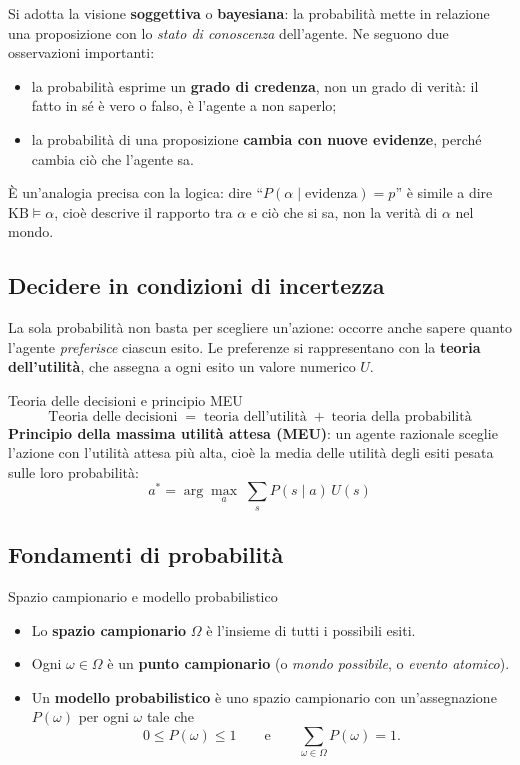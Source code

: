 \documentclass[11pt, a4paper]{article}
\renewcommand{\emph}[1]{\textcolor{verdechiaro}{\itshape #1}}
\newcommand{\KB}{\mathrm{KB}}
\begin{document}
Si adotta la visione \textbf{soggettiva} o \textbf{bayesiana}: la probabilità mette in relazione una proposizione con lo \emph{stato di conoscenza} dell'agente. Ne seguono due osservazioni importanti:
\begin{itemize}
  \item la probabilità esprime un \textbf{grado di credenza}, non un grado di verità: il fatto in sé è vero o falso, è l'agente a non saperlo;
  \item la probabilità di una proposizione \textbf{cambia con nuove evidenze}, perché cambia ciò che l'agente sa.
\end{itemize}

È un'analogia precisa con la logica: dire ``$P(\alpha \mid \text{evidenza}) = p$'' è simile a dire $\KB \models \alpha$, cioè descrive il rapporto tra $\alpha$ e ciò che si sa, non la verità di $\alpha$ nel mondo.

\subsection{Decidere in condizioni di incertezza}

La sola probabilità non basta per scegliere un'azione: occorre anche sapere quanto l'agente \emph{preferisce} ciascun esito. Le preferenze si rappresentano con la \textbf{teoria dell'utilità}, che assegna a ogni esito un valore numerico $U$.

\begin{chiave}{Teoria delle decisioni e principio MEU}
  \[
    \text{Teoria delle decisioni} \;=\; \text{teoria dell'utilità} \;+\; \text{teoria della probabilità}
  \]
  \textbf{Principio della massima utilità attesa (MEU)}: un agente razionale sceglie l'azione con l'utilità attesa più alta, cioè la media delle utilità degli esiti pesata sulle loro probabilità:
  \[
    a^* = \arg\max_{a} \; \sum_{s} P(s \mid a)\, U(s)
  \]
\end{chiave}

\subsection{Fondamenti di probabilità}

\begin{defbox}{Spazio campionario e modello probabilistico}
  \begin{itemize}
    \item Lo \textbf{spazio campionario} $\Omega$ è l'insieme di tutti i possibili esiti.
    \item Ogni $\omega \in \Omega$ è un \textbf{punto campionario} (o \emph{mondo possibile}, o \emph{evento atomico}).
    \item Un \textbf{modello probabilistico} è uno spazio campionario con un'assegnazione $P(\omega)$ per ogni $\omega$ tale che
    \[
      0 \le P(\omega) \le 1 \qquad\text{e}\qquad \sum_{\omega\in\Omega} P(\omega) = 1 .
    \]
  \end{itemize}
\end{defbox}
\end{document}
